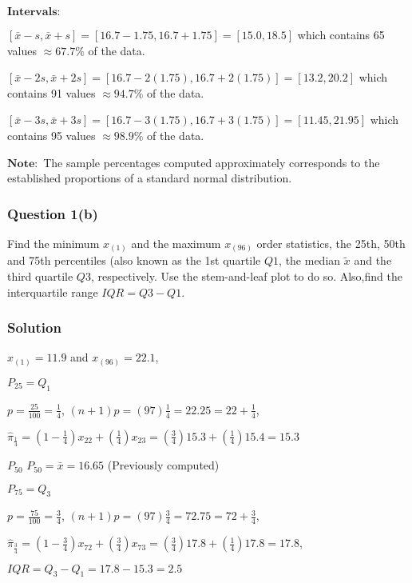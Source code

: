 \documentclass[]{article}
\begin{document}
\(\mathbf{Intervals:}\)

\([\bar{x} - s, \bar{x} + s] = [16.7 - 1.75, 16.7 + 1.75] = [15.0, 18.5]\)
which contains 65 values \(\approx 67.7\%\) of the data.

\([\bar{x} - 2s, \bar{x} + 2s] = [16.7 - 2(1.75), 16.7 + 2(1.75)] = [13.2, 20.2]\)
which contains 91 values \(\approx 94.7\%\) of the data.

\([\bar{x} - 3s, \bar{x} + 3s] = [16.7 - 3(1.75), 16.7 + 3(1.75)] = [11.45, 21.95]\)
which contains 95 values \(\approx 98.9\%\) of the data.

\(\mathbf{Note:}\) The sample percentages computed approximately
corresponds to the established proportions of a standard normal
distribution.

\medskip

\hypertarget{question-1b}{%
\subsubsection{Question 1(b)}\label{question-1b}}

Find the minimum \(x_{(1)}\) and the maximum \(x_{(96)}\) order
statistics, the 25th, 50th and 75th percentiles (also known as the 1st
quartile \(Q1\), the median \(\tilde{x}\) and the third quartile \(Q3\),
respectively. Use the stem-and-leaf plot to do so. Also,find the
interquartile range \(IQR = Q3 - Q1\).

\hypertarget{solution-1}{%
\subsubsection{Solution}\label{solution-1}}

\(x_{(1)}=11.9\) and \(x_{(96)}=22.1\),

\(P_{25}=Q_1\)

\(p=\frac{25}{100}=\frac{1}{4}\),
\((n+1)p=(97)\frac{1}{4}=22.25 = 22+\frac{1}{4}\),

\(\hat{\pi}_{\frac{1}{4}}=(1-\frac{1}{4})x_{22}+(\frac{1}{4})x_{23}=(\frac{3}{4})15.3+(\frac{1}{4})15.4=15.3\)

\(P_{50}\) \(P_{50} = \bar{x}=16.65\) (Previously computed)

\(P_{75}=Q_3\)

\(p=\frac{75}{100}=\frac{3}{4}\),
\((n+1)p=(97)\frac{3}{4}=72.75 = 72+\frac{3}{4}\),

\(\hat{\pi}_{\frac{3}{4}}=(1-\frac{3}{4})x_{72}+(\frac{3}{4})x_{73}=(\frac{3}{4})17.8+(\frac{1}{4})17.8=17.8\),

\(IQR = Q_3-Q_1=17.8-15.3=2.5\)
\end{document}
